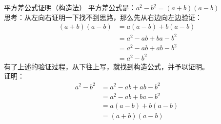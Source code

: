 \documentclass[aspectratio=169]{ctexbeamer} %
\begin{document}
\begin{frame}[t]{平方差公式证明（构造法）}
  平方差公式是：$a^2 - b^2 = (a + b)(a - b)$\\
  思考：从左向右证明一下找不到思路，那么先从右边向左边验证：
\begin{align*}
  (a + b)(a - b) &= a(a - b) + b(a - b)  \\
  &= a^2 - ab + ba - b^2 \\
  &= a^2 - ab + ab - b^2 \\
  &= a^2 - b^2
 \end{align*}
有了上述的验证过程，从下往上写，就找到构造公式，并予以证明。\\

证明：
\begin{align*}
  a^2 - b^2  &= a^2 - ab + ab - b^2 \\
  &= a^2 - ab + ba - b^2 \\
  &= a(a - b) + b(a - b) \\
  &= (a + b)(a - b) 
 \end{align*}

\end{frame}
\end{document}
